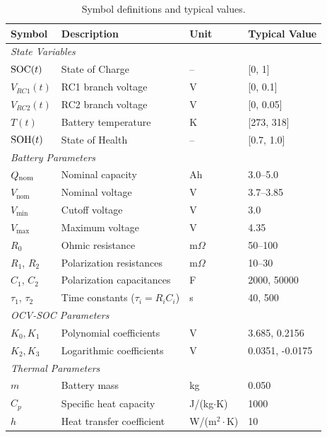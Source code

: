 \begin{table}[H]
    \centering
    \caption{Symbol definitions and typical values.}
    \label{tab:symbols}
    \small
    \begin{tabular}{llll}
        \toprule
        \textbf{Symbol} & \textbf{Description} & \textbf{Unit} & \textbf{Typical Value} \\
        \midrule
        \multicolumn{4}{l}{\textit{State Variables}} \\
        $\text{SOC}(t)$ & State of Charge & -- & [0, 1] \\
        $V_{RC1}(t)$ & RC1 branch voltage & V & [0, 0.1] \\
        $V_{RC2}(t)$ & RC2 branch voltage & V & [0, 0.05] \\
        $T(t)$ & Battery temperature & K & [273, 318] \\
        $\text{SOH}(t)$ & State of Health & -- & [0.7, 1.0] \\
        \midrule
        \multicolumn{4}{l}{\textit{Battery Parameters}} \\
        $Q_{\text{nom}}$ & Nominal capacity & Ah & 3.0--5.0 \\
        $V_{\text{nom}}$ & Nominal voltage & V & 3.7--3.85 \\
        $V_{\min}$ & Cutoff voltage & V & 3.0 \\
        $V_{\max}$ & Maximum voltage & V & 4.35 \\
        $R_0$ & Ohmic resistance & m$\Omega$ & 50--100 \\
        $R_1$, $R_2$ & Polarization resistances & m$\Omega$ & 10--30 \\
        $C_1$, $C_2$ & Polarization capacitances & F & 2000, 50000 \\
        $\tau_1$, $\tau_2$ & Time constants ($\tau_i = R_i C_i$) & s & 40, 500 \\
        \midrule
        \multicolumn{4}{l}{\textit{OCV-SOC Parameters}} \\
        $K_0, K_1$ & Polynomial coefficients & V & 3.685, 0.2156 \\
        $K_2, K_3$ & Logarithmic coefficients & V & 0.0351, -0.0175 \\
        \midrule
        \multicolumn{4}{l}{\textit{Thermal Parameters}} \\
        $m$ & Battery mass & kg & 0.050 \\
        $C_p$ & Specific heat capacity & J/(kg$\cdot$K) & 1000 \\
        $h$ & Heat transfer coefficient & W/(m$^2\cdot$K) & 10 \\

\end{tabular}
\end{table}
